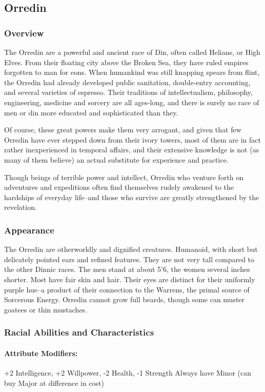 \documentclass[oneside,11pt,english]{book}
\begin{document}
\subsection{Orredin}
\subsubsection*{Overview} 
The Orredin are a powerful and ancient race of Din, often called Helians, or High Elves. From their 
floating city above the Broken Sea, they have ruled empires forgotten to man for eons. When humankind 
was still knapping spears from flint, the Orredin had already developed public sanitation, double-entry 
accounting, and several varieties of espresso. Their traditions of intellectualism, philosophy, engineering, 
medicine and sorcery are all ages-long, and there is surely no race of men or din more educated and sophisticated than they. 

Of course, these great powers make them very arrogant, and given that few Orredin have ever stepped 
down from their ivory towers, most of them are in fact rather inexperienced in temporal affairs, and their 
extensive knowledge is not (as many of them believe) an actual substitute for experience and practice. 

Though beings of terrible power and intellect, Orredin who venture forth on adventures and expeditions 
often find themselves rudely awakened to the hardships of everyday life--and those who survive are 
greatly strengthened by the revelation. 
\subsubsection*{Appearance} 
The Orredin are otherworldly and dignified creatures. Humanoid, with short but delicately pointed ears 
and refined features. They are not very tall compared to the other Dinnic races. The men stand at about 
5’6, the women several inches shorter. Most have fair skin and hair. Their eyes are distinct for their 
uniformly purple hue--a product of their connection to the Warrens, the primal source of Sorcerous 
Energy. Orredin cannot grow full beards, though some can muster goatees or thin mustaches. 
\subsubsection*{Racial Abilities and Characteristics} 
\paragraph{Attribute Modifiers:} +2 Intelligence, +2 Willpower, -2 Health, -1 Strength 
Always have  Minor (can buy  Major at difference in cost)
\end{document}
